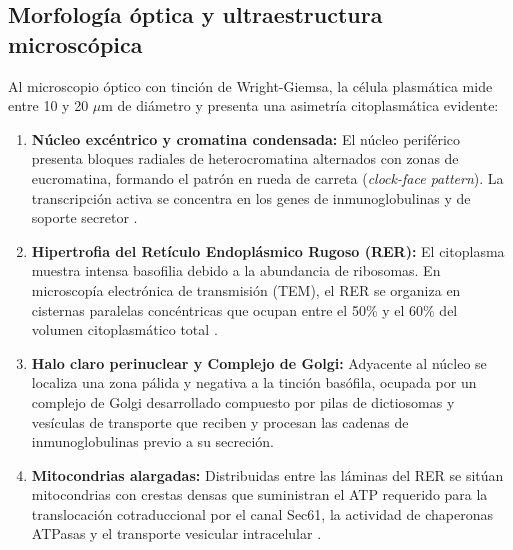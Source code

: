 \subsection{Morfología óptica y ultraestructura microscópica}
Al microscopio óptico con tinción de Wright-Giemsa, la célula plasmática mide entre 10 y 20 $\mu$m de diámetro y presenta una asimetría citoplasmática evidente:
\begin{enumerate}
	\item \textbf{Núcleo excéntrico y cromatina condensada:} El núcleo periférico presenta bloques radiales de heterocromatina alternados con zonas de eucromatina, formando el patrón en rueda de carreta (\emph{clock-face pattern}). La transcripción activa se concentra en los genes de inmunoglobulinas y de soporte secretor \parencite{alberts2022molecular}.
	\item \textbf{Hipertrofia del Retículo Endoplásmico Rugoso (RER):} El citoplasma muestra intensa basofilia debido a la abundancia de ribosomas. En microscopía electrónica de transmisión (TEM), el RER se organiza en cisternas paralelas concéntricas que ocupan entre el 50\% y el 60\% del volumen citoplasmático total \parencite{cenci2008progressive}.
	\item \textbf{Halo claro perinuclear y Complejo de Golgi:} Adyacente al núcleo se localiza una zona pálida y negativa a la tinción basófila, ocupada por un complejo de Golgi desarrollado compuesto por pilas de dictiosomas y vesículas de transporte que reciben y procesan las cadenas de inmunoglobulinas previo a su secreción.
	\item \textbf{Mitocondrias alargadas:} Distribuidas entre las láminas del RER se sitúan mitocondrias con crestas densas que suministran el ATP requerido para la translocación cotraduccional por el canal Sec61, la actividad de chaperonas ATPasas y el transporte vesicular intracelular \parencite{lam2018metabolic}.
\end{enumerate}

